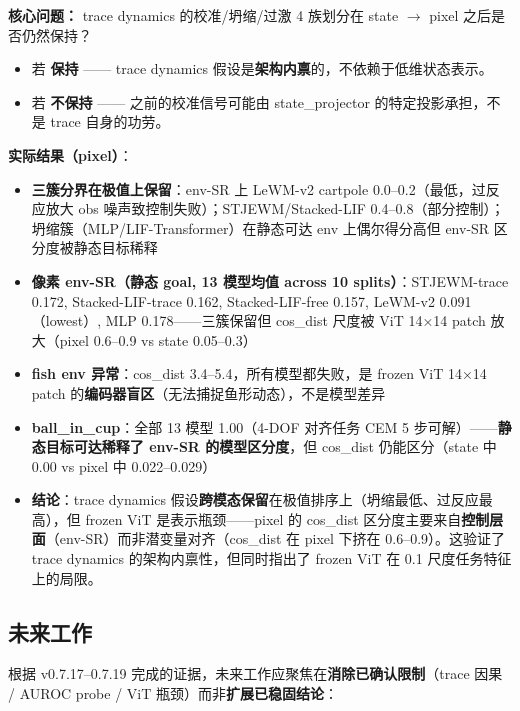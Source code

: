 \documentclass[11pt,a4paper]{article}
\begin{document}
\textbf{核心问题：} trace dynamics 的校准/坍缩/过激 4 族划分在 state $\to$ pixel 之后是否仍然保持？
\begin{itemize}[leftmargin=2em]
\item 若 \textbf{保持} —— trace dynamics 假设是\textbf{架构内禀}的，不依赖于低维状态表示。
\item 若 \textbf{不保持} —— 之前的校准信号可能由 state\_projector 的特定投影承担，不是 trace 自身的功劳。
\end{itemize}

\textbf{实际结果（pixel）}：
\begin{itemize}[leftmargin=2em]
\item \textbf{三簇分界在极值上保留}：env-SR 上 LeWM-v2 cartpole 0.0--0.2（最低，过反应放大 obs 噪声致控制失败）；STJEWM/Stacked-LIF 0.4--0.8（部分控制）；坍缩簇（MLP/LIF-Transformer）在静态可达 env 上偶尔得分高但 env-SR 区分度被静态目标稀释
\item \textbf{像素 env-SR（静态 goal, 13 模型均值 across 10 splits）}：STJEWM-trace 0.172, Stacked-LIF-trace 0.162, Stacked-LIF-free 0.157, LeWM-v2 0.091（lowest）, MLP 0.178——三簇保留但 cos\_dist 尺度被 ViT 14×14 patch 放大（pixel 0.6--0.9 vs state 0.05--0.3）
\item \textbf{fish env 异常}：cos\_dist 3.4--5.4，所有模型都失败，是 frozen ViT 14×14 patch 的\textbf{编码器盲区}（无法捕捉鱼形动态），不是模型差异
\item \textbf{ball\_in\_cup}：全部 13 模型 1.00（4-DOF 对齐任务 CEM 5 步可解）——\textbf{静态目标可达稀释了 env-SR 的模型区分度}，但 cos\_dist 仍能区分（state 中 0.00 vs pixel 中 0.022--0.029）
\item \textbf{结论}：trace dynamics 假设\textbf{跨模态保留}在极值排序上（坍缩最低、过反应最高），但 frozen ViT 是表示瓶颈——pixel 的 cos\_dist 区分度主要来自\textbf{控制层面}（env-SR）而非潜变量对齐（cos\_dist 在 pixel 下挤在 0.6--0.9）。这验证了 trace dynamics 的架构内禀性，但同时指出了 frozen ViT 在 0.1 尺度任务特征上的局限。
\end{itemize}

\subsection{未来工作}

根据 v0.7.17--0.7.19 完成的证据，未来工作应聚焦在\textbf{消除已确认限制}（trace 因果 / AUROC probe / ViT 瓶颈）而非\textbf{扩展已稳固结论}：
\end{document}
